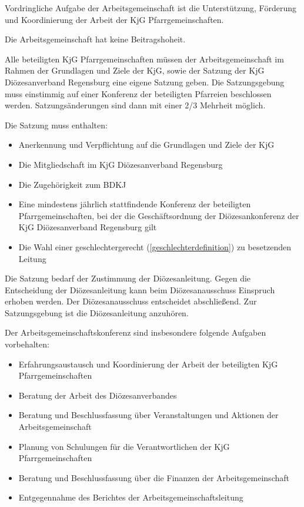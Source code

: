 \documentclass[12pt]{report}
\begin{document}
\begin{justify}
Vordringliche Aufgabe der Arbeitsgemeinschaft ist die Unterstützung, Förderung und Koordinierung
der Arbeit der KjG Pfarrgemeinschaften.

Die Arbeitsgemeinschaft hat keine Beitragshoheit.

Alle beteiligten KjG Pfarrgemeinschaften müssen der Arbeitsgemeinschaft im Rahmen der Grundlagen
und Ziele der KjG, sowie der Satzung der KjG Diözesanverband Regensburg eine eigene
Satzung geben. Die Satzungsgebung muss einstimmig auf einer Konferenz der beteiligten Pfarreien
beschlossen werden. Satzungsänderungen sind dann mit einer 2/3 Mehrheit möglich.

Die Satzung muss enthalten:
\begin{itemize}
  \item Anerkennung und Verpflichtung auf die Grundlagen und Ziele der KjG
  \item Die Mitgliedschaft im KjG Diözesanverband Regensburg
  \item Die Zugehörigkeit zum BDKJ
  \item Eine mindestens jährlich stattfindende Konferenz der beteiligten Pfarrgemeinschaften, bei der
        die Geschäftsordnung der Diözesankonferenz der KjG Diözesanverband Regensburg gilt
  \item Die Wahl einer geschlechtergerecht (\ref{geschlechterdefinition}) zu besetzenden Leitung
\end{itemize}

Die Satzung bedarf der Zustimmung der Diözesanleitung. Gegen die Entscheidung der Diözesanleitung
kann beim Diözesanausschuss Einspruch erhoben werden. Der Diözesanausschuss entscheidet
abschließend. Zur Satzungsgebung ist die Diözesanleitung
anzuhören.

Der Arbeitsgemeinschaftskonferenz sind insbesondere folgende Aufgaben vorbehalten:
\begin{itemize}
  \item Erfahrungsaustausch und Koordinierung der Arbeit der beteiligten KjG Pfarrgemeinschaften
  \item Beratung der Arbeit des Diözesanverbandes
  \item Beratung und Beschlussfassung über Veranstaltungen und Aktionen der Arbeitsgemeinschaft
  \item Planung von Schulungen für die Verantwortlichen der KjG Pfarrgemeinschaften
  \item Beratung und Beschlussfassung über die Finanzen der Arbeitsgemeinschaft
  \item Entgegennahme des Berichtes der Arbeitsgemeinschaftsleitung
\end{itemize}

\end{justify}
\end{document}
